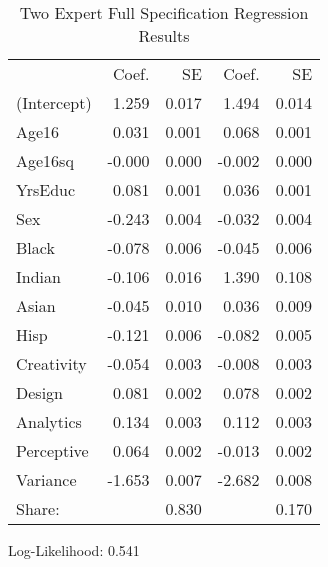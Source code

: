 \documentclass[12pt]{article}
\begin{document}
\begin{table} \centering
  \caption{Two Expert Full Specification Regression Results}
    \begin{threeparttable}
      \begin{tabular}[l]{l r r r r}
\cmidrule{1-5}
                & Coef.  &  SE   &  Coef.   & SE  \\
\cmidrule(l){2-3}  \cmidrule(l){4-5}
(Intercept)     &  1.259   &  0.017     &    1.494   & 0.014  \\
Age16           &  0.031   &  0.001     &    0.068   & 0.001  \\
Age16sq         & -0.000   &  0.000     &   -0.002   & 0.000  \\
YrsEduc         &  0.081   &  0.001     &    0.036   & 0.001  \\
Sex             & -0.243   &  0.004     &   -0.032   & 0.004  \\
Black           & -0.078   &  0.006     &   -0.045   & 0.006  \\
Indian          & -0.106   &  0.016     &    1.390   & 0.108  \\
Asian           & -0.045   &  0.010     &    0.036   & 0.009  \\
Hisp            & -0.121   &  0.006     &   -0.082   & 0.005  \\
Creativity      & -0.054   &  0.003     &   -0.008   & 0.003  \\
Design          &  0.081   &  0.002     &    0.078   & 0.002  \\
Analytics       &  0.134   &  0.003     &    0.112   & 0.003  \\
Perceptive      &  0.064   &  0.002     &   -0.013   & 0.002  \\
Variance        & -1.653   &  0.007     &   -2.682   & 0.008  \\
\cmidrule(l){2-3}  \cmidrule(l){4-5}
Share:          &          &  0.830     &            & 0.170  \\
\cmidrule{1-5}
      \end{tabular}

      \begin{tablenotes}
        \item Log-Likelihood: 0.541

      \end{tablenotes} \label{tbl:2E_full_regressions_results}


    \end{threeparttable}

\end{table}
\end{document}
